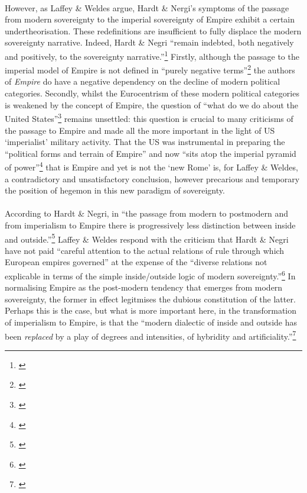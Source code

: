 \documentclass[12pt,a4paper,titlepage]{article}
\begin{document}
\paragraph{}However, as Laffey \& Weldes argue, Hardt \& Nergi's symptoms of the passage from modern sovereignty to the imperial sovereignty of Empire exhibit a certain undertheorisation. These redefinitions are insufficient to fully displace the modern sovereignty narrative. Indeed, Hardt \& Negri ``remain indebted, both negatively and positively, to the sovereignty narrative.''\footnote{\cite[p. 128]{laffey:2005ri}} Firstly, although the passage to the imperial model of Empire is not defined in ``purely negative terms''\footnote{\cite[p. 13]{Hardt:2001jl}} the authors of \textit{Empire} do have a negative dependency on the decline of modern political categories. Secondly, whilst the Eurocentrism of these modern political categories is weakened by the concept of Empire, the question of ``what do we do about the United States''\footnote{\cite[p. 130]{laffey:2005ri}} remains unsettled: this question is crucial to many criticisms of the passage to Empire and made all the more important in the light of US `imperialist' military activity. That the US was instrumental in preparing the ``political forms and terrain of Empire'' and now ``sits atop the imperial pyramid of power''\footnote{\cite[p. 131]{laffey:2005ri}} that is Empire and yet is not the `new Rome' is, for Laffey \& Weldes, a contradictory and unsatisfactory conclusion, however precarious and temporary the position of hegemon in this new paradigm of sovereignty.

\paragraph{}According to Hardt \& Negri, in ``the passage from modern to postmodern and from imperialism to Empire there is progressively less distinction between inside and outside.''\footnote{\cite[p. 187]{Hardt:2001jl}} Laffey \& Weldes respond with the criticism that Hardt \& Negri have not paid ``careful attention to the actual relations of rule through which European empires governed'' at the expense of the ``diverse relations not explicable in terms of the simple inside/outside logic of modern sovereignty.''\footnote{\cite[p. 132]{laffey:2005ri}} In normalising Empire as the post-modern tendency that emerges from modern sovereignty, the former in effect legitmises the dubious constitution of the latter. Perhaps this is the case, but what is more important here, in the transformation of imperialism to Empire, is that the ``modern dialectic of inside and outside has been \textit{replaced} by a play of degrees and intensities, of hybridity and artificiality.''\footnote{\cite[pp. 187-8, my emphasis.]{Hardt:2001jl}}
\end{document}
